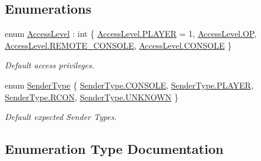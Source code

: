 \subsection*{Enumerations}
\begin{DoxyCompactItemize}
\item 
enum \hyperlink{namespace_o_t_a_1_1_command_a8b5f51579148d05d330f1911083e7a8e}{Access\+Level} \+: int \{ \hyperlink{namespace_o_t_a_1_1_command_a8b5f51579148d05d330f1911083e7a8ea07c80e2a355d91402a00d82b1fa13855}{Access\+Level.\+P\+L\+A\+Y\+E\+R} = 1, 
\hyperlink{namespace_o_t_a_1_1_command_a8b5f51579148d05d330f1911083e7a8ea7457cdd15d09bfc6c4dbb5d2b6f87390}{Access\+Level.\+O\+P}, 
\hyperlink{namespace_o_t_a_1_1_command_a8b5f51579148d05d330f1911083e7a8ea2f76a17583676d1e769f74885a5bd411}{Access\+Level.\+R\+E\+M\+O\+T\+E\+\_\+\+C\+O\+N\+S\+O\+L\+E}, 
\hyperlink{namespace_o_t_a_1_1_command_a8b5f51579148d05d330f1911083e7a8ea4695859f52d337ca3d7020b2c8f7882a}{Access\+Level.\+C\+O\+N\+S\+O\+L\+E}
 \}\begin{DoxyCompactList}\small\item\em Default access privileges. \end{DoxyCompactList}
\item 
enum \hyperlink{namespace_o_t_a_1_1_command_a7d2b04368b1225808532428bd2f63ae8}{Sender\+Type} \{ \hyperlink{namespace_o_t_a_1_1_command_a7d2b04368b1225808532428bd2f63ae8a4695859f52d337ca3d7020b2c8f7882a}{Sender\+Type.\+C\+O\+N\+S\+O\+L\+E}, 
\hyperlink{namespace_o_t_a_1_1_command_a7d2b04368b1225808532428bd2f63ae8a07c80e2a355d91402a00d82b1fa13855}{Sender\+Type.\+P\+L\+A\+Y\+E\+R}, 
\hyperlink{namespace_o_t_a_1_1_command_a7d2b04368b1225808532428bd2f63ae8af2d3ec013c88e111064483739a50a7f4}{Sender\+Type.\+R\+C\+O\+N}, 
\hyperlink{namespace_o_t_a_1_1_command_a7d2b04368b1225808532428bd2f63ae8a696b031073e74bf2cb98e5ef201d4aa3}{Sender\+Type.\+U\+N\+K\+N\+O\+W\+N}
 \}\begin{DoxyCompactList}\small\item\em Default expected Sender Types. \end{DoxyCompactList}
\end{DoxyCompactItemize}


\subsection{Enumeration Type Documentation}
\hypertarget{namespace_o_t_a_1_1_command_a8b5f51579148d05d330f1911083e7a8e}{}
